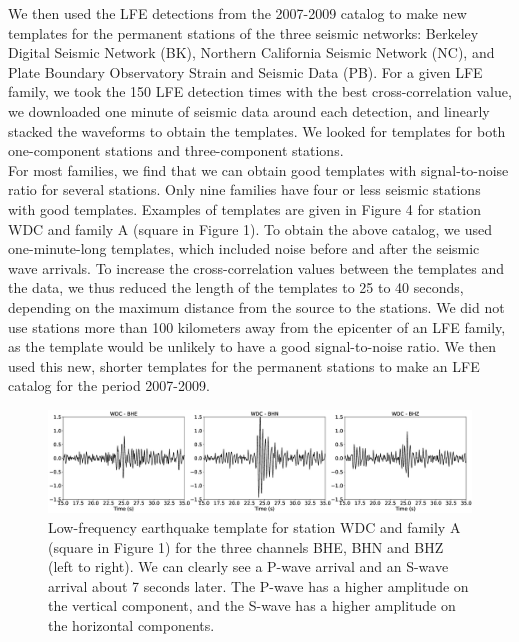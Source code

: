 \documentclass[draft]{agujournal2019}
\begin{document}
We then used the LFE detections from the 2007-2009 catalog to make new templates for the permanent stations of the three seismic networks: Berkeley Digital Seismic Network (BK), Northern California Seismic Network (NC), and Plate Boundary Observatory Strain and Seismic Data (PB). For a given LFE family, we took the 150 LFE detection times with the best cross-correlation value, we downloaded one minute of seismic data around each detection, and linearly stacked the waveforms to obtain the templates. We looked for templates for both one-component stations and three-component stations. \\

For most families, we find that we can obtain good templates with signal-to-noise ratio for several stations. Only nine families have four or less seismic stations with good templates. Examples of templates are given in Figure 4 for station WDC and family A (square in Figure 1). To obtain the above catalog, we used one-minute-long templates, which included noise before and after the seismic wave arrivals. To increase the cross-correlation values between the templates and the data, we thus reduced the length of the templates to 25 to 40 seconds, depending on the maximum distance from the source to the stations. We did not use stations more than 100 kilometers away from the epicenter of an LFE family, as the template would be unlikely to have a good signal-to-noise ratio. We then used this new, shorter templates for the permanent stations to make an LFE catalog for the period 2007-2009. \\

\begin{figure}
\noindent\includegraphics[width=\textwidth, trim={0cm 0cm 0cm 0cm},clip]{figures/templates.eps}
\caption{Low-frequency earthquake template for station WDC and family A (square in Figure 1) for the three channels BHE, BHN and BHZ (left to right). We can clearly see a P-wave arrival and an S-wave arrival about 7 seconds later. The P-wave has a higher amplitude on the vertical component, and the S-wave has a higher amplitude on the horizontal components.}
\label{pngfiguresample}
\end{figure}
\end{document}
